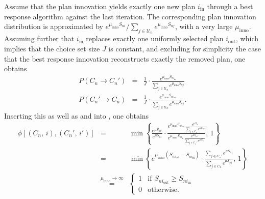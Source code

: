 Assume that the plan innovation yields exactly
one new plan $i_{\text{in}}$ through a
best response algorithm
%
%
against the last iteration.
%
%
The corresponding plan innovation distribution is
approximated by $e^{\mu_{\text{inno}}S_{ni}}/\sum_{j\in \mathcal{U}_n}e^{\mu_{\text{inno}}S_{nj}}$,
with a very large $\mu_{\text{inno}}$. Assuming further that $i_{\text{in}}$
replaces exactly one uniformly selected plan $i_{\text{out}}$, 
which implies that the choice set size $J$ is constant, 
and excluding for simplicity the case that the best response innovation
reconstructs exactly the removed plan,
one obtains
\begin{eqnarray}
P(C_{n}\rightarrow C_{n}') & = & \frac{1}{J}\cdot\frac{e^{\mu_{\text{inno}}S_{ni_{\text{in}}}}}{\sum_{j\in \mathcal{U}_n}e^{\mu_{\text{inno}}S_{nj}}}\\
P(C_{n}'\rightarrow C_{n}) & = & \frac{1}{J}\cdot\frac{e^{\mu_{\text{inno}}S_{ni_{\text{out}}}}}{\sum_{j\in \mathcal{U}_n}e^{\mu_{\text{inno}}S_{nj}}}.
\end{eqnarray}
Inserting this as well as  and 
into , one obtains 
\begin{eqnarray}
\phi[(C_{n},\, i),(C_{n}',\, i')] & = & 
\min\left\{ 
\frac{e^{\mu S_{ni'}}}{e^{\mu S_{ni}}}\cdot
\frac{{\displaystyle e^{\mu_{\text{inno}}S_{ni_{\text{out}}}}\frac{\displaystyle e^{\mu S_{ni}}}{\sum_{j\in C_{n}}\displaystyle e^{\mu S_{nj}}}}}
{{\displaystyle e^{\mu_{\text{inno}}S_{ni_{\text{in}}}}\frac{\displaystyle e^{\mu S_{ni'}}}{\sum_{j\in C_{n}'} \displaystyle e^{\mu S_{nj}}}}},\,1\right\} \\
 & = & 
 \min\left\{ 
 {\displaystyle e^{\mu_{\text{inno}}(S_{ni_{\text{out}}}-S_{ni_{\text{in}}})}} \cdot
 \frac{\sum_{j\in C_{n}'} \displaystyle e^{\mu S_{nj}}}{\sum_{j\in C_{n}} \displaystyle e^{\mu S_{nj}}},\,1\right\} \\[.5em]
\label{eq:limiting-accept-proba}
& \stackrel{\mu_{\text{inno}}\rightarrow\infty}{=} & 
\begin{cases}
1 & \text{if } S_{ni_{\text{out}}}\geq S_{ni_{\text{in}}} \\
0 & \text{otherwise.}
\end{cases}
\end{eqnarray}
